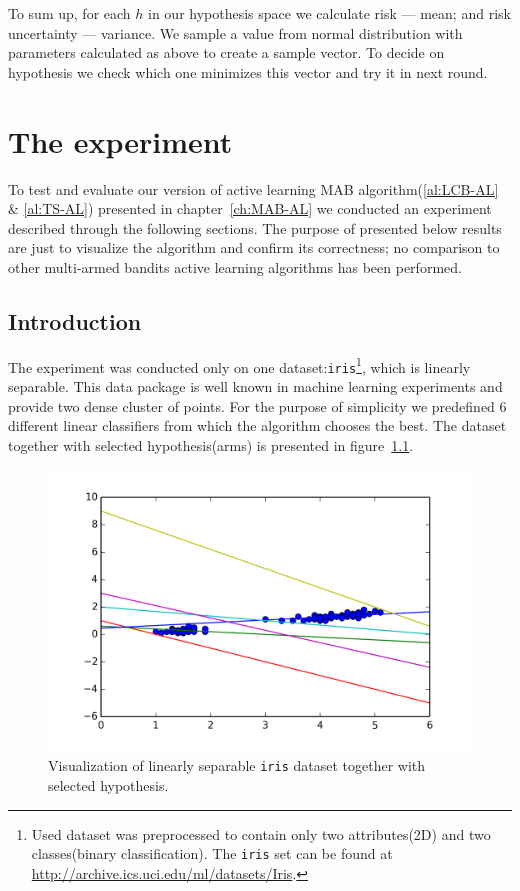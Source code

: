\documentclass[12pt, a4paper, pdflatex, leqno]{report}
\begin{document}
To sum up, for each $h$ in our hypothesis space we calculate risk --- mean; and risk uncertainty --- variance. We sample a value from normal distribution with parameters calculated as above to create a sample vector. To decide on hypothesis we check which one minimizes this vector and try it in next round.\\






\chapter{The experiment}
To test and evaluate our version of active learning MAB algorithm(\ref{al:LCB-AL} \& \ref{al:TS-AL}) presented in chapter~\ref{ch:MAB-AL} we conducted an experiment described through the following sections. The purpose of presented below results are just to visualize the algorithm and confirm its correctness; no comparison to other multi-armed bandits active learning algorithms has been performed.\\

\section{Introduction}
The experiment was conducted only on one dataset:\texttt{iris}\footnote{Used dataset was preprocessed to contain only two attributes(2D) and two classes(binary classification). The \texttt{iris} set can be found at \url{http://archive.ics.uci.edu/ml/datasets/Iris}.}, which is linearly separable. This data package is well known in machine learning experiments and provide two dense cluster of points. For the purpose of simplicity we predefined 6 different linear classifiers from which the algorithm chooses the best. The dataset together with selected hypothesis(arms) is presented in figure~\ref{fig:hyp}.\\

\begin{figure}[htbp]
  \centering
  \includegraphics[width=0.7\linewidth]{graphics/gypothesis.png}
  \begin{tiny}
    \caption{Visualization of linearly separable \texttt{iris} dataset together with selected hypothesis.\label{fig:hyp}}
  \end{tiny}
  \vspace{1cm}
\end{figure}
\end{document}
